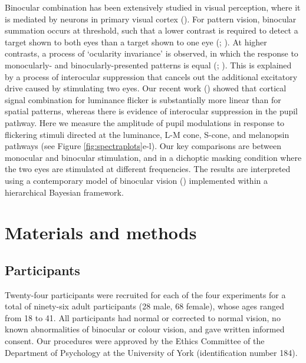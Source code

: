 \documentclass[
]{article}
\begin{document}
Binocular combination has been extensively studied in visual perception, where it is mediated by neurons in primary visual cortex (). For pattern vision, binocular summation occurs at threshold, such that a lower contrast is required to detect a target shown to both eyes than a target shown to one eye (; ). At higher contrasts, a process of `ocularity invariance' is observed, in which the response to monocularly- and binocularly-presented patterns is equal (; ). This is explained by a process of interocular suppression that cancels out the additional excitatory drive caused by stimulating two eyes. Our recent work () showed that cortical signal combination for luminance flicker is substantially more linear than for spatial patterns, whereas there is evidence of interocular suppression in the pupil pathway. Here we measure the amplitude of pupil modulations in response to flickering stimuli directed at the luminance, L-M cone, S-cone, and melanopsin pathways (see Figure \ref{fig:spectraplots}e-l). Our key comparisons are between monocular and binocular stimulation, and in a dichoptic masking condition where the two eyes are stimulated at different frequencies. The results are interpreted using a contemporary model of binocular vision () implemented within a hierarchical Bayesian framework.

\section{Materials and methods}\label{materials-and-methods}

\subsection{Participants}\label{participants}

Twenty-four participants were recruited for each of the four experiments for a total of ninety-six adult participants (28 male, 68 female), whose ages ranged from 18 to 41. All participants had normal or corrected to normal vision, no known abnormalities of binocular or colour vision, and gave written informed consent. Our procedures were approved by the Ethics Committee of the Department of Psychology at the University of York (identification number 184).
\end{document}
